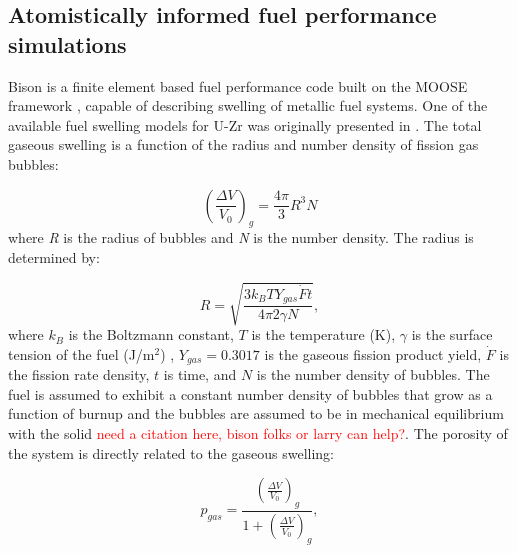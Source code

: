 \documentclass[review]{elsarticle}
\begin{document}
\FloatBarrier

\subsection{Atomistically informed fuel performance simulations}

Bison is a finite element based fuel performance code built on the MOOSE framework \cite{tonks2017}, capable of describing swelling of metallic fuel systems. One of the available fuel swelling models for U-Zr was originally presented in \cite{olander76}. The total gaseous swelling is a function of the radius and number density of fission gas bubbles:

\begin{equation}
  \left(\frac{\Delta V}{V_0}\right)_{g}=\frac{4\pi}{3}R^3 N
  \label{eq:swelling}
\end{equation} where \textit{R} is the radius of bubbles and \textit{N} is the number density. The radius is determined by:

\begin{equation}
  \label{bubble_radius}
  R = \sqrt{\frac{3 k_B T Y_{gas} \dot{F} t}{4 \pi 2 \gamma N}},
\end{equation} where $k_B$ is the Boltzmann constant, $T$ is the temperature (K), $\gamma$ is the surface tension of the fuel (J/m$^2$) \cite{karahan2009}, $Y_{gas}=0.3017$ is the gaseous fission product yield, $\dot{F}$ is the fission rate density, $t$ is time, and $N$ is the number density of bubbles. The fuel is assumed to exhibit a constant number density of bubbles that grow as a function of burnup and the bubbles are assumed to be in mechanical equilibrium with the solid \cite{LLS_report} \textcolor{red}{need a citation here, bison folks or larry can help?}. The porosity of the system is directly related to the gaseous swelling: 

\begin{equation}
  p_{gas} = \frac{\left(\frac{\Delta V}{V_0}\right)_{g}}{1 + \left(\frac{\Delta V}{V_0}\right)_{g}},
\end{equation}
\end{document}
